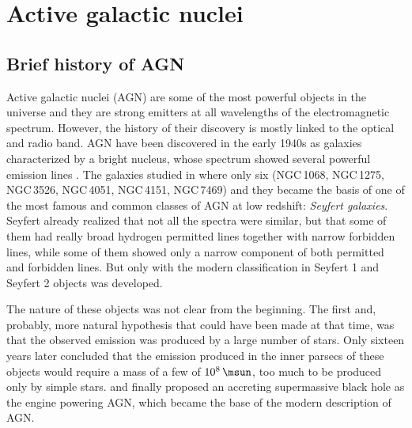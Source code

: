 \documentclass[../main.tex]{subfiles}
\begin{document}
\chapter{Active galactic nuclei}
\label{cap:agn}

\section{Brief history of AGN}
\label{sec:intro_history}
Active galactic nuclei (AGN) are some of the most powerful objects in the universe and they are strong emitters at all wavelengths of the electromagnetic spectrum.
However, the history of their discovery is mostly linked to the optical and radio band.
AGN have been discovered in the early 1940s as galaxies characterized by a bright nucleus, whose spectrum showed several powerful emission lines \citep{Seyfert43}.
The galaxies studied in \citet{Seyfert43} where only six (NGC\,1068, NGC\,1275, NGC\,3526, NGC\,4051, NGC\,4151, NGC\,7469) and they became the basis of one of the most famous and common classes of AGN at low redshift: \emph{Seyfert galaxies}. 
Seyfert already realized that not all the spectra were similar, but that some of them had really broad hydrogen permitted lines together with narrow forbidden lines, while some of them showed only a narrow component of both permitted and forbidden lines. 
But only with \citet{Khachikian74} the modern classification in Seyfert 1 and Seyfert 2 objects was developed.

The nature of these objects was not clear from the beginning.
The first and, probably, more natural hypothesis that could have been made at that time, was that the observed emission was produced by a large number of stars.
Only sixteen years later \citet{Woltjer59} concluded that the emission produced in the inner parsecs of these objects would require a mass of a few of $10^8\,\si{\msun}$, too much to be produced only by simple stars.
\citet{Salpeter64} and \citet{Zeldovich64} finally proposed an accreting supermassive black hole as the engine powering AGN, which became the base of the modern description of AGN. 
\end{document}
